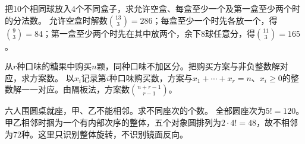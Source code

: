 把10个相同球放入4个不同盒子，求允许空盒、每盒至少一个及第一盒至少两个时的分法数。
\solutionanswer
允许空盒时解数\(\binom{13}3=286\)；每盒至少一个时先各放一个，得\(\binom93=84\)；第一盒至少两个时先在其中放两个，余下8球任意分，得\(\binom{11}3=165\)。


从\(r\)种口味的糖果中购买\(n\)颗，同种口味不加区分。把购买方案与非负整数解对应，求方案数。
\solutionanswer
以\(x_i\)记录第\(i\)种口味购买数，方案与\(x_1+\cdots+x_r=n\)、\(x_i\ge0\)的整数解一一对应。由隔板法，方案数\(\binom{n+r-1}{r-1}\)。


六人围圆桌就座，甲、乙不能相邻。求不同座次的个数。
\solutionanswer
全部圆座次为\(5!=120\)。甲乙相邻时捆为一个有内部次序的整体，五个对象圆排列为\(2\cdot4!=48\)，故不相邻为\(72\)种。这里只识别整体旋转，不识别镜面反向。
\par
